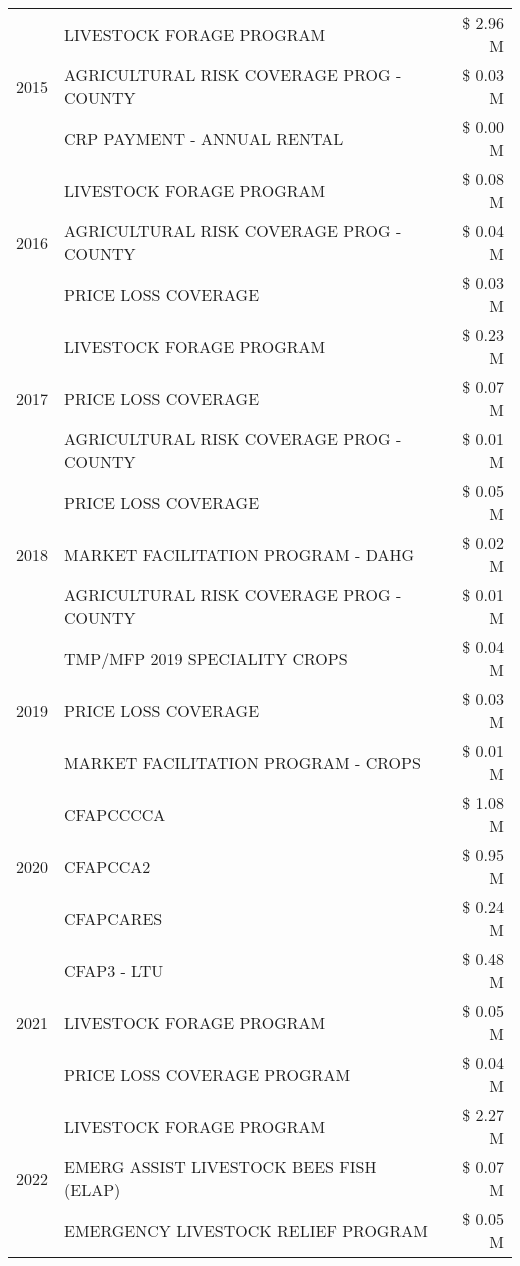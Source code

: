 \begin{tabular}{llr}
\cline{1-3}
\multirow[t]{3}{*}{2015} & LIVESTOCK FORAGE PROGRAM & \$ 2.96 M \\
 & AGRICULTURAL RISK COVERAGE PROG - COUNTY & \$ 0.03 M \\
 & CRP PAYMENT - ANNUAL RENTAL & \$ 0.00 M \\
\cline{1-3}
\multirow[t]{3}{*}{2016} & LIVESTOCK FORAGE PROGRAM & \$ 0.08 M \\
 & AGRICULTURAL RISK COVERAGE PROG - COUNTY & \$ 0.04 M \\
 & PRICE LOSS COVERAGE & \$ 0.03 M \\
\cline{1-3}
\multirow[t]{3}{*}{2017} & LIVESTOCK FORAGE PROGRAM & \$ 0.23 M \\
 & PRICE LOSS COVERAGE & \$ 0.07 M \\
 & AGRICULTURAL RISK COVERAGE PROG - COUNTY & \$ 0.01 M \\
\cline{1-3}
\multirow[t]{3}{*}{2018} & PRICE LOSS COVERAGE & \$ 0.05 M \\
 & MARKET FACILITATION PROGRAM - DAHG & \$ 0.02 M \\
 & AGRICULTURAL RISK COVERAGE PROG - COUNTY & \$ 0.01 M \\
\cline{1-3}
\multirow[t]{3}{*}{2019} & TMP/MFP 2019 SPECIALITY CROPS & \$ 0.04 M \\
 & PRICE LOSS COVERAGE & \$ 0.03 M \\
 & MARKET FACILITATION PROGRAM - CROPS & \$ 0.01 M \\
\cline{1-3}
\multirow[t]{3}{*}{2020} & CFAPCCCCA & \$ 1.08 M \\
 & CFAPCCA2 & \$ 0.95 M \\
 & CFAPCARES & \$ 0.24 M \\
\cline{1-3}
\multirow[t]{3}{*}{2021} & CFAP3 - LTU & \$ 0.48 M \\
 & LIVESTOCK FORAGE PROGRAM & \$ 0.05 M \\
 & PRICE LOSS COVERAGE PROGRAM & \$ 0.04 M \\
\cline{1-3}
\multirow[t]{3}{*}{2022} & LIVESTOCK FORAGE PROGRAM & \$ 2.27 M \\
 & EMERG ASSIST LIVESTOCK BEES FISH (ELAP) & \$ 0.07 M \\
 & EMERGENCY LIVESTOCK RELIEF PROGRAM & \$ 0.05 M \\
\cline{1-3}
\bottomrule
\end{tabular}

